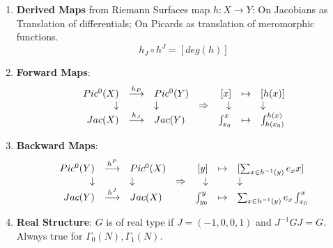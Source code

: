 \documentclass{article}
\newcommand{\C}{\mathbb{C}}
\newcommand{\Z}{\mathbb{Z}}
\newcommand{\ra}{\rightarrow}
\newcommand{\Ra}{\Rightarrow}
\newcommand{\da}{\downarrow}
\newcommand{\raa}[1]{\overset{#1}{\longrightarrow}}
\begin{document}
\begin{multicols}{2}
\begin{enumerate}
\item \textbf{Derived Maps} from Riemann Surfaces map $h: X \ra Y$: On Jacobians as Translation of differentials; On Picards as translation of meromorphic functions. $$h_J \circ h^J = [deg(h)]$$

 


\item \textbf{Forward Maps}:
\[\begin{array}{rcl c rcl}
Pic^0(X) & \raa{h_P} & Pic^0(Y) && [x] & \mapsto & [h(x)] \\
\da & & \da &\Ra& \da & & \da \\
Jac(X) & \raa{h_J} & Jac(Y) && \int_{x_0}^x & \mapsto & \int_{h(x_0)}^{h(x)}\\ 
\end{array}\]
\item \textbf{Backward Maps}:
\[\begin{array}{rcl c rcl}
Pic^0(Y) & \raa{h^P} & Pic^0(X) && [y] & \mapsto & [\sum_{x \in h^{-1}(y)} e_x x] \\
\da & & \da &\Ra& \da & & \da \\
Jac(Y) & \raa{h^J} & Jac(X) &&  \int_{y_0}^y & \mapsto & \sum_{x \in h^{-1}(y)} e_x \int_{x_0}^{x}\\ 
\end{array}\]


\item \textbf{Real Structure}: $G$ is of real type if $J = (-1,0,0,1)$ and $J^{-1}GJ = G$. Always true for $\Gamma_0(N), \Gamma_1(N)$. 


\end{enumerate}
\end{multicols}
\end{document}
